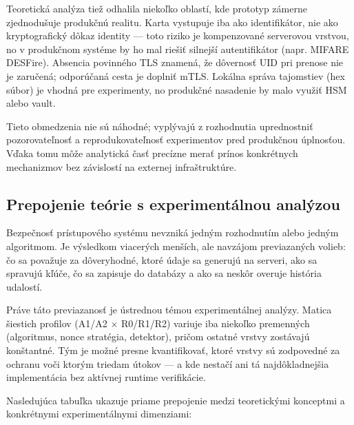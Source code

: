 \documentclass[journal,a4paper,onecolumn]{IEEEtran}
\begin{document}
Teoretická analýza tiež odhalila niekoľko oblastí, kde prototyp zámerne zjednodušuje produkčnú realitu. Karta vystupuje iba ako identifikátor, nie ako kryptografický dôkaz identity --- toto riziko je kompenzované serverovou vrstvou, no v produkčnom systéme by ho mal riešiť silnejší autentifikátor (napr. MIFARE DESFire\cite{GarciaMIFARE2008}). Absencia povinného TLS znamená, že dôvernosť UID pri prenose nie je zaručená; odporúčaná cesta je doplniť mTLS\cite{RFC8446,RFC9325}. Lokálna správa tajomstiev (hex súbor) je vhodná pre experimenty, no produkčné nasadenie by malo využiť HSM alebo vault\cite{NIST80057}.

Tieto obmedzenia nie sú náhodné; vyplývajú z rozhodnutia uprednostniť pozorovateľnosť a reprodukovateľnosť experimentov pred produkčnou úplnosťou. Vďaka tomu môže analytická časť precízne merať prínos konkrétnych mechanizmov bez závislostí na externej infraštruktúre.

\subsection{Prepojenie teórie s experimentálnou analýzou}

Bezpečnosť prístupového systému nevzniká jedným rozhodnutím alebo jedným algoritmom. Je výsledkom viacerých menších, ale navzájom previazaných volieb: čo sa považuje za dôveryhodné, ktoré údaje sa generujú na serveri, ako sa spravujú kľúče, čo sa zapisuje do databázy a ako sa neskôr overuje história udalostí.

Práve táto previazanosť je ústrednou témou experimentálnej analýzy. Matica šiestich profilov (A1/A2 $\times$ R0/R1/R2) variuje iba niekoľko premenných (algoritmus, nonce stratégia, detektor), pričom ostatné vrstvy zostávajú konštantné. Tým je možné presne kvantifikovať, ktoré vrstvy sú zodpovedné za ochranu voči ktorým triedam útokov --- a kde nestačí ani tá najdôkladnejšia implementácia bez aktívnej runtime verifikácie.

Nasledujúca tabuľka ukazuje priame prepojenie medzi teoretickými konceptmi a konkrétnymi experimentálnymi dimenziami:
\end{document}
